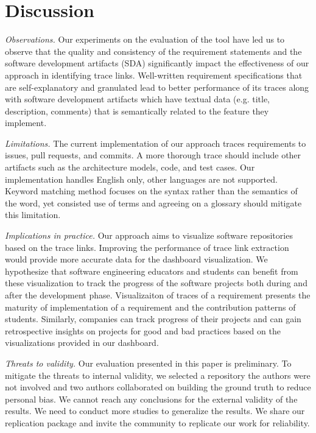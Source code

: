 \section{Discussion}
\label{sec:discuss}

\emph{Observations.} Our experiments on the evaluation of the tool have led us to observe that the quality and consistency of the requirement statements and the software development artifacts (SDA) significantly impact the effectiveness of our approach in identifying trace links. Well-written requirement specifications that are self-explanatory and granulated lead to better performance of its traces along with software development artifacts which have textual data (e.g. title, description, comments) that is semantically related to the feature they implement.

\emph{Limitations.} The current implementation of our approach traces requirements to issues, pull requests, and commits. A more thorough trace should include other artifacts such as the architecture models, code, and test cases. Our implementation handles English only, other languages are not supported. Keyword matching method focuses on the syntax rather than the semantics of the word, yet consisted use of terms and agreeing on a glossary should mitigate this limitation.

\emph{Implications in practice.} Our approach aims to visualize software repositories based on the trace links. Improving the performance of trace link extraction would provide more accurate data for the dashboard visualization. We hypothesize that software engineering educators and students can benefit from these visualization to track the progress of the software projects both during and after the development phase. Visualizaiton of traces of a requirement presents the maturity of implementation of a requirement and the contribution patterns of students. Similarly, companies can track progress of their projects and can gain retrospective insights on projects for good and bad practices based on the visualizations provided in our dashboard.

\emph{Threats to validity.} Our evaluation presented in this paper is preliminary. To mitigate the threats to internal validity, we selected a repository the authors were not involved and two authors collaborated on building the ground truth to reduce personal bias. We cannot reach any conclusions for the external validity of the results. We need to conduct more studies to generalize the results. We share our replication package and invite the community to replicate our work for reliability.





